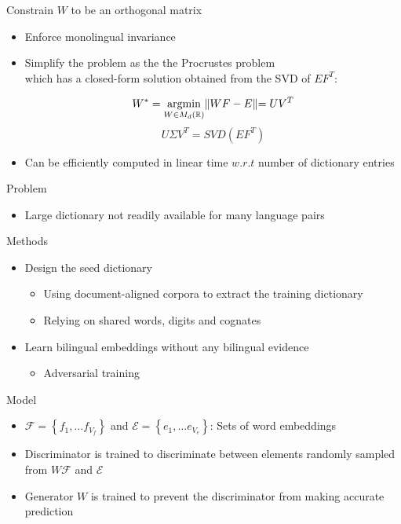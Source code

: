 \documentclass[11pt, a4paper, landscape]{article}
\newcommand*{\argmin}{\ensuremath{\operatornamewithlimits{argmin}}\xspace}
\begin{document}
	
	
	\NewPage
	\vfill
	Constrain ${W}$ to be an orthogonal matrix
	\begin{itemize}
		\item Enforce monolingual invariance
		
		\item Simplify the problem as the the Procrustes problem\\ which has a closed-form solution obtained from the SVD of  ${EF^T}$:
		
		
		
		\[ W^* = \argmin\limits_{W \in M_d( \mathbb{R})} \lVert WF-E\lVert  =  UV^T\]
		\[ U\varSigma V^T =  SVD(EF^T)\]
		
		\item Can be efficiently computed in linear time ${w.r.t}$ number of dictionary entries
	\end{itemize}
	\vfill
	\NewPage
	\vfill
	Problem
	\begin{itemize}
		\item Large dictionary not readily available for many language pairs\\
	\end{itemize}
	
	
	Methods
	\begin{itemize}
		\item Design the seed dictionary
		\begin{itemize}
			\item Using document-aligned corpora to extract the training dictionary
			\item Relying on shared words, digits and cognates
		\end{itemize}
		\item 	Learn bilingual embeddings without any bilingual evidence
		\begin{itemize}
			\item Adversarial training
			
		\end{itemize}
	\end{itemize}
	\vfill
	
	
	\NewPage
	\vfill
	Model
	\begin{itemize}
		\item  ${\mathcal{F} = \left\{ f_1, \ldots f_{V_f} \right\} }$ and  ${\mathcal{E} = \left\{ e_1, \ldots e_{V_e} \right\} }$: Sets of word embeddings
		\item Discriminator is trained to discriminate between elements randomly sampled from ${W \mathcal{F}}$ and ${\mathcal{E}}$ 
		\item Generator ${W}$ is trained to prevent the discriminator from making accurate prediction
		
	\end{itemize}
	
\end{document}
